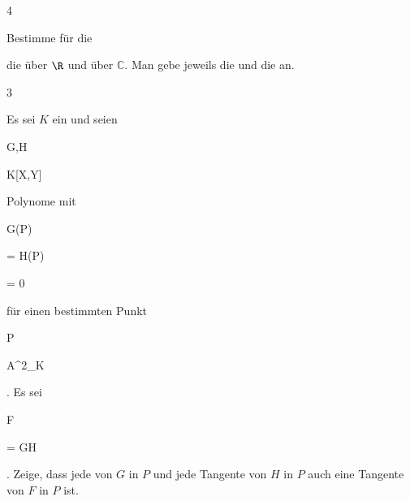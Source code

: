 {} {}



{4}

{


Bestimme für die


 die
über $\R$ und über ${\mathbb C}$. Man gebe jeweils die
und die
an.


}

{} {}



{3}

{


Es sei $K$ ein
und seien


\mavergleichskette

{\vergleichskette

{ G,H
}

{ \in }{ K[X,Y]
}

{  }{
}

{    }{
}

{   }{
}

}
{}{}{}
Polynome mit


\mavergleichskette

{\vergleichskette

{ G(P)
}

{ = }{ H(P)
}

{ = }{ 0
}

{    }{
}

{   }{
}

}
{}{}{}
für einen bestimmten Punkt


\mavergleichskette

{\vergleichskette

{ P
}

{ \in }{ {\mathbb A}^{2}_{K}
}

{  }{
}

{    }{
}

{   }{
}

}
{}{}{.}
Es sei


\mavergleichskette

{\vergleichskette

{ F
}

{ = }{ GH
}

{  }{
}

{    }{
}

{   }{
}

}
{}{}{.}
Zeige, dass jede
von $G$ in $P$ und jede Tangente von $H$ in $P$ auch eine Tangente von $F$ in $P$ ist.


}

